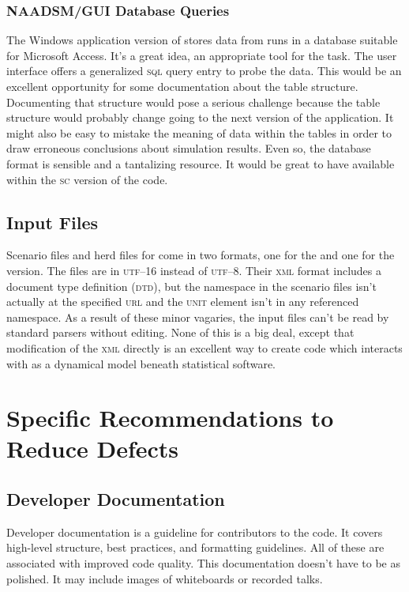 \documentclass{article}
\begin{document}
\subsubsection{NAADSM/GUI Database Queries}
The Windows application version of \naadsm stores data
from runs in a database suitable for Microsoft Access.
It's a great idea, an appropriate tool for the task.
The user interface offers a generalized \textsc{sql}
query entry to probe the data. This would be an excellent
opportunity for some documentation about the table
structure. Documenting that structure would pose a
serious challenge because the table structure would probably
change going to the next version of the application.
It might also be easy to mistake the meaning of data
within the tables in order to draw erroneous conclusions
about simulation results. Even so, the database format
is sensible and a tantalizing resource. It would be
great to have available within the \textsc{sc} version
of the code.


\subsection{Input Files}
Scenario files and herd files for \naadsm come in
two formats, one for the \gui and one for the \nsc version.
The \nsc files are in \textsc{utf--16} instead of \textsc{utf--8}.
Their \textsc{xml} format includes a document type definition
(\textsc{dtd}), but the namespace in the scenario files
isn't actually at the specified \textsc{url} and the 
\textsc{unit} element isn't in any referenced namespace.
As a result of these minor vagaries, the input files
can't be read by standard parsers without editing.
None of this is a big deal, except that modification
of the \textsc{xml} directly is an excellent way to
create code which interacts with \naadsm as a dynamical
model beneath statistical software.


\section{Specific Recommendations to Reduce Defects}
\subsection{Developer Documentation}

Developer documentation is a guideline for contributors
to the code. It covers high-level structure, best practices,
and formatting guidelines. All of these are associated with
improved code quality. This documentation doesn't have to be
as polished. It may include images of whiteboards or recorded
talks.
\end{document}
